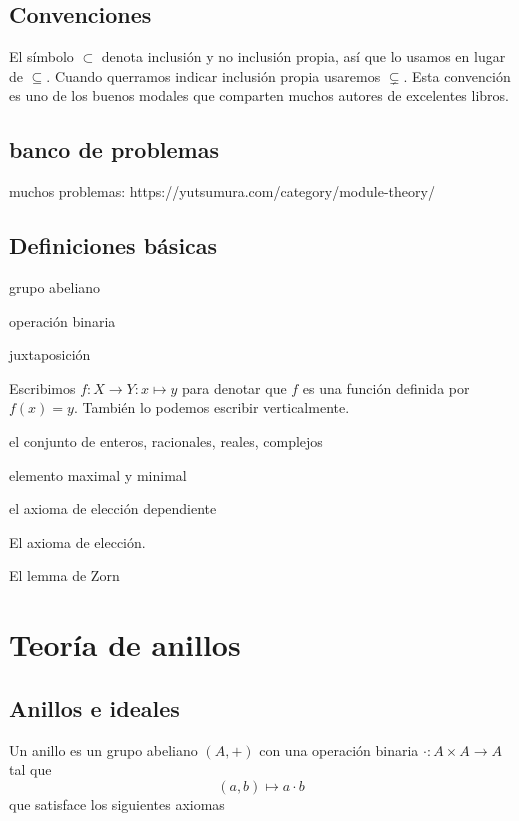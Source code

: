\documentclass[b5paper,10pt]{book}
\begin{document}
\section{Convenciones}

El símbolo \(\subset\) denota inclusión y no inclusión propia,
así que lo usamos en lugar de \(\subseteq\).
Cuando querramos indicar inclusión propia usaremos \(\subsetneq\).	
Esta convención es uno de los buenos modales
que comparten muchos autores de excelentes libros.

\section{banco de problemas}
muchos problemas: https://yutsumura.com/category/module-theory/
\section{Definiciones básicas}

\begin{defi}
grupo abeliano
\end{defi}

\begin{defi}
operación binaria
\end{defi}
juxtaposición

Escribimos \(f\colon X\to Y: x\mapsto y\)
para denotar que \(f\) es una función definida por 
\(f(x)=y\).
También lo podemos escribir verticalmente.

el conjunto de enteros, racionales, reales, complejos

elemento maximal y minimal

el axioma de elección dependiente

El axioma de elección.

El lemma de Zorn

\chapter{Teoría de anillos}
\section{Anillos e ideales}



\begin{defi}
Un anillo es un grupo abeliano \((A,+)\) con una operación binaria
\(\cdot : A\times A\to A\) tal que
\[
	(a,b)\mapsto a\cdot b
\]
que satisface los siguientes axiomas
\end{defi}
\end{document}
